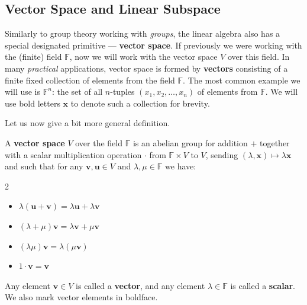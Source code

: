 \documentclass[../../book.tex]{subfiles}
\begin{document}
\subsection{Vector Space and Linear Subspace}

Similarly to group theory working with \textit{groups}, the linear algebra also
has a special designated primitive --- \textbf{vector space}. If previously we
were working with the (finite) field $\mathbb{F}$, now we will work with the
vector space $V$ over this field. In many \textit{practical} applications, vector space
is formed by \textbf{vectors} consisting of a finite fixed collection of
elements from the field $\mathbb{F}$. 
The most common example we will use is $\mathbb{F}^n$: the set of all $n$-tuples $(x_1,x_2,\dots,x_n)$ of
elements from $\mathbb{F}$.
We will use bold letters $\mathbf{x}$ to denote such a collection for brevity.

Let us now give a bit more general definition.

\begin{definition}
    A \textbf{vector space} $V$ over the field $\mathbb{F}$ is an abelian group for addition $+$ together with a scalar multiplication operation $\cdot$ from $\mathbb{F} \times V$ to $V$, sending $(\lambda,\mathbf{x}) \mapsto \lambda \mathbf{x}$ and such that for any $\mathbf{v},\mathbf{u} \in V$ and $\lambda,\mu \in \mathbb{F}$ we have:
    \begin{xmulticols}{2}
        \begin{itemize}
            \item $\lambda(\mathbf{u}+\mathbf{v}) = \lambda \mathbf{u} + \lambda \mathbf{v}$
            \item $(\lambda + \mu)\mathbf{v} = \lambda \mathbf{v} + \mu \mathbf{v}$
            \item $(\lambda \mu)\mathbf{v} = \lambda(\mu \mathbf{v})$
            \item $1\cdot \mathbf{v} = \mathbf{v}$
        \end{itemize}
    \end{xmulticols}

    Any element $\mathbf{v} \in V$ is called a \textbf{vector}, and any element $\lambda \in \mathbb{F}$ is called a \textbf{scalar}. We also mark vector elements in boldface.
\end{definition}

\vspace{-4mm}
\end{document}
